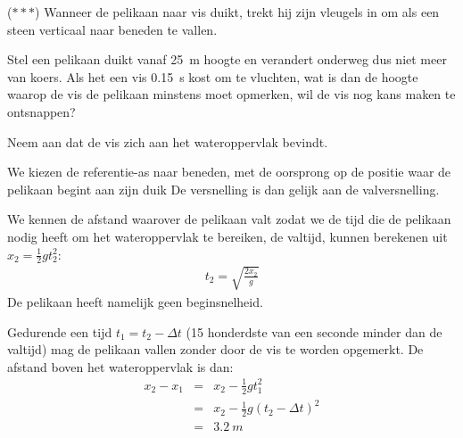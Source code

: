 \documentclass{ximera}
\begin{document}
\begin{exercise}
    ($\ast\ast\ast$) Wanneer de pelikaan naar vis duikt, trekt hij zijn vleugels in om als een steen verticaal naar beneden te vallen.

    Stel een pelikaan duikt vanaf \SI{25}{m} hoogte en verandert onderweg dus niet meer van koers. Als het een vis \SI{0,15}{s} kost om te vluchten, wat is dan de hoogte waarop de vis de pelikaan minstens moet opmerken, wil de vis nog kans maken te ontsnappen?

    Neem aan dat de vis zich aan het wateroppervlak bevindt.

    \begin{oplossing}
        We kiezen de referentie-as naar beneden, met de oorsprong op de positie waar de pelikaan begint aan zijn duik De versnelling is dan gelijk aan de valversnelling. 

        We kennen de afstand waarover de pelikaan valt zodat we de tijd die de pelikaan nodig heeft om het wateroppervlak te bereiken, de valtijd, kunnen berekenen uit $x_2=\frac{1}{2}gt_2^2 $:
        \begin{eqnarray*}
            t_2=\sqrt{\frac{2x_2}{g}}
        \end{eqnarray*}
        De pelikaan heeft namelijk geen beginsnelheid.

        Gedurende een tijd $t_1=t_2-\Delta t$ (15 honderdste van een seconde minder dan de valtijd) mag de pelikaan vallen zonder door de vis te worden opgemerkt. De afstand boven het wateroppervlak is dan:
        \begin{eqnarray*}
            x_2-x_1&=&x_2-\frac{1}{2}gt_1^2\\
            &=&x_2-\frac{1}{2}g\left(t_2-\Delta t\right)^2\\
            &=&\SI{3,2}{m}
        \end{eqnarray*}
    \end{oplossing} 
\end{exercise}
\end{document}
